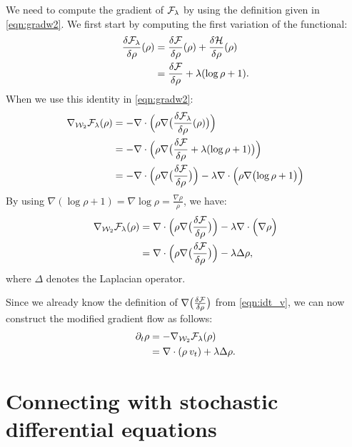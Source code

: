\documentclass{article}
\newcommand{\W}{{\cal W}_2}
\newcommand{\F}{{\cal F}}
\newcommand{\He}{{\cal H}}
\begin{document}
We need to compute the gradient of $\F_\lambda$ by using the definition given in \eqref{eqn:gradw2}. We first start by computing the first variation of the functional:
\begin{align}
\frac{\delta \F_\lambda}{\delta \rho} (\rho ) &= \frac{\delta \F}{\delta \rho} (\rho ) + \frac{\delta \He}{\delta \rho} (\rho ) \\
&= \frac{\delta \F}{\delta \rho} + \lambda  (\log \rho +1 ) .
\end{align}
When we use this identity in \eqref{eqn:gradw2}:
\begin{align}
\nabla_{\W} \F_\lambda(\rho) &= -\nabla \cdot \Bigl( \rho \nabla \bigl( \frac{\delta \F_\lambda}{\delta \rho}(\rho) \bigr) \Bigr) \\
&= -\nabla \cdot \Bigl( \rho \nabla \bigl( \frac{\delta \F}{\delta \rho} +  \lambda  (\log \rho +1 ) \bigr) \Bigr) \\
&= -\nabla \cdot \Bigl( \rho \nabla \bigl( \frac{\delta \F}{\delta \rho} \bigr) \Bigr) -  \lambda \nabla \cdot \Bigl( \rho \nabla \bigl( \log \rho +1  \bigr) \Bigr)
\end{align}
By using $\nabla ( \log \rho +1  ) = \nabla \log \rho = \frac{\nabla \rho}{\rho} $, we have:
\begin{align}
\nabla_{\W} \F_\lambda(\rho) &= \nabla \cdot \Bigl( \rho \nabla \bigl( \frac{\delta \F}{\delta \rho} \bigr) \Bigr) -  \lambda \nabla \cdot \Bigl( \nabla \rho \Bigr) \\
&= \nabla \cdot \Bigl( \rho \nabla \bigl( \frac{\delta \F}{\delta \rho} \bigr) \Bigr) -  \lambda \Delta \rho,
\end{align}
where $\Delta$ denotes the Laplacian operator.

Since we already know the definition of $\nabla \bigl( \frac{\delta \F}{\delta \rho} \bigr)$ from \eqref{eqn:idt_v}, we can now construct the modified gradient flow as follows:
\begin{align}
\partial_t \rho &= - \nabla_{\W} \F_\lambda(\rho) \\
&=  \nabla \cdot (\rho \> v_t) + \lambda \Delta \rho. \label{eqn:gradflow_reg}
\end{align}

\section{Connecting with stochastic differential equations}
\end{document}

